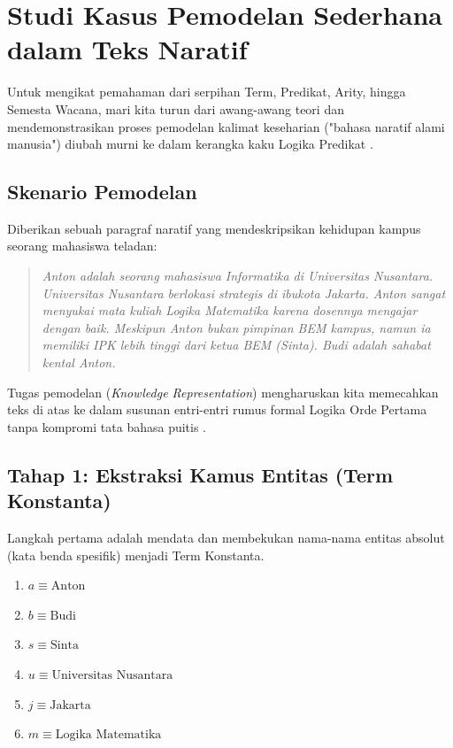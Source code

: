 \section{Studi Kasus Pemodelan Sederhana dalam Teks Naratif}

Untuk mengikat pemahaman dari serpihan Term, Predikat, Arity, hingga Semesta Wacana, mari kita turun dari awang-awang teori dan mendemonstrasikan proses pemodelan kalimat keseharian ("bahasa naratif alami manusia") diubah murni ke dalam kerangka kaku Logika Predikat \cite{rosen2019}.

\subsection{Skenario Pemodelan}

Diberikan sebuah paragraf naratif yang mendeskripsikan kehidupan kampus seorang mahasiswa teladan:

\begin{quote}
\textit{Anton adalah seorang mahasiswa Informatika di Universitas Nusantara. Universitas Nusantara berlokasi strategis di ibukota Jakarta. Anton sangat menyukai mata kuliah Logika Matematika karena dosennya mengajar dengan baik. Meskipun Anton bukan pimpinan BEM kampus, namun ia memiliki IPK lebih tinggi dari ketua BEM (Sinta). Budi adalah sahabat kental Anton.}
\end{quote}

Tugas pemodelan (\textit{Knowledge Representation}) mengharuskan kita memecahkan teks di atas ke dalam susunan entri-entri rumus formal Logika Orde Pertama tanpa kompromi tata bahasa puitis \cite{wiki_first_order_logic}.

\subsection{Tahap 1: Ekstraksi Kamus Entitas (Term Konstanta)}

Langkah pertama adalah mendata dan membekukan nama-nama entitas absolut (kata benda spesifik) menjadi Term Konstanta.
\begin{enumerate}
    \item $a \equiv \text{Anton}$
    \item $b \equiv \text{Budi}$
    \item $s \equiv \text{Sinta}$
    \item $u \equiv \text{Universitas Nusantara}$
    \item $j \equiv \text{Jakarta}$
    \item $m \equiv \text{Logika Matematika}$
\end{enumerate}

